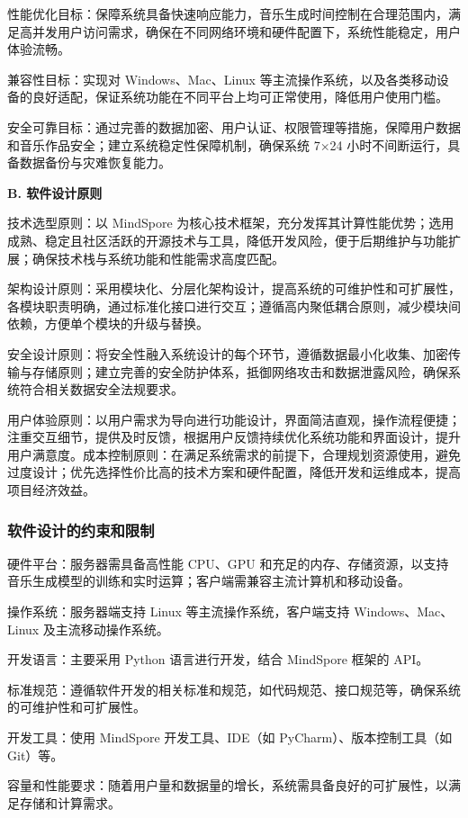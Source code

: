\documentclass{base}
\numberwithin{figure}{section} %
\begin{document}
性能优化目标：保障系统具备快速响应能力，音乐生成时间控制在合理范围内，满足高并发用户访问需求，确保在不同网络环境和硬件配置下，系统性能稳定，用户体验流畅。

兼容性目标：实现对 Windows、Mac、Linux 等主流操作系统，以及各类移动设备的良好适配，保证系统功能在不同平台上均可正常使用，降低用户使用门槛。​

安全可靠目标：通过完善的数据加密、用户认证、权限管理等措施，保障用户数据和音乐作品安全；建立系统稳定性保障机制，确保系统 7×24 小时不间断运行，具备数据备份与灾难恢复能力。​

\textbf{B. 软件设计原则​}

技术选型原则：以 MindSpore 为核心技术框架，充分发挥其计算性能优势；选用成熟、稳定且社区活跃的开源技术与工具，降低开发风险，便于后期维护与功能扩展；确保技术栈与系统功能和性能需求高度匹配。​

架构设计原则：采用模块化、分层化架构设计，提高系统的可维护性和可扩展性，各模块职责明确，通过标准化接口进行交互；遵循高内聚低耦合原则，减少模块间依赖，方便单个模块的升级与替换。​

安全设计原则：将安全性融入系统设计的每个环节，遵循数据最小化收集、加密传输与存储原则；建立完善的安全防护体系，抵御网络攻击和数据泄露风险，确保系统符合相关数据安全法规要求。​

用户体验原则：以用户需求为导向进行功能设计，界面简洁直观，操作流程便捷；注重交互细节，提供及时反馈，根据用户反馈持续优化系统功能和界面设计，提升用户满意度。​
成本控制原则：在满足系统需求的前提下，合理规划资源使用，避免过度设计；优先选择性价比高的技术方案和硬件配置，降低开发和运维成本，提高项目经济效益。

\subsubsection{软件设计的约束和限制}

硬件平台：服务器需具备高性能 CPU、GPU 和充足的内存、存储资源，以支持音乐生成模型的训练和实时运算；客户端需兼容主流计算机和移动设备。

操作系统：服务器端支持 Linux 等主流操作系统，客户端支持 Windows、Mac、Linux 及主流移动操作系统。

开发语言：主要采用 Python 语言进行开发，结合 MindSpore 框架的 API。

标准规范：遵循软件开发的相关标准和规范，如代码规范、接口规范等，确保系统的可维护性和可扩展性。

开发工具：使用 MindSpore 开发工具、IDE（如 PyCharm）、版本控制工具（如 Git）等。

容量和性能要求：随着用户量和数据量的增长，系统需具备良好的可扩展性，以满足存储和计算需求。
\end{document}
